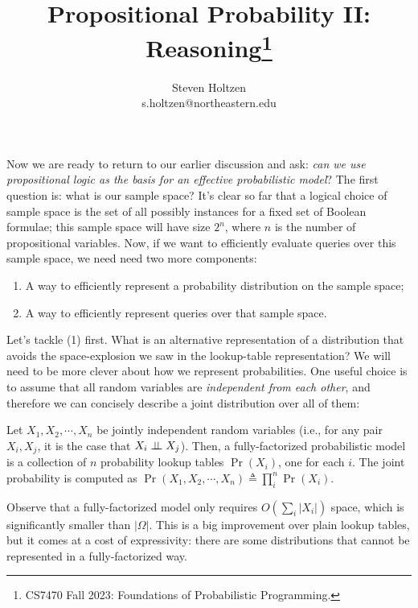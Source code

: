 \documentclass{tufte-handout}
\title{Propositional Probability II: Reasoning\thanks{CS7470 Fall 2023: Foundations of Probabilistic Programming.}}
\author[]{Steven Holtzen\\s.holtzen@northeastern.edu}
\begin{document}
\maketitle%


Now we are ready to return to our earlier discussion and ask: \emph{can we use
propositional logic as the basis for an effective probabilistic model}?
The first question is: what is our sample space? It's clear so far that a logical 
choice of sample space is the set of all possibly instances for a fixed set 
of Boolean formulae; this sample space will have size $2^n$, where $n$ is the number 
of propositional variables.
Now, if we want to efficiently evaluate queries over this sample space, we need
need two more components:
\begin{enumerate}
    \item A way to efficiently represent a probability distribution on the sample space;
    \item A way to efficiently represent queries over that sample space.
\end{enumerate}

Let's tackle (1) first. What is an alternative representation of a distribution 
that avoids the space-explosion we saw in the lookup-table representation? We 
will need to be more clever about how we represent probabilities. One useful
choice is to assume that all random variables are \emph{independent from each other}, 
and therefore we can concisely describe a joint distribution over all of them:

\begin{definition}
    Let $X_1, X_2, \cdots, X_n$ be jointly independent random variables (i.e.,
    for any pair $X_i, X_j$, it is the case that $X_i \perp \!\!\! \perp X_j$). Then, a
    fully-factorized probabilistic model is a collection of $n$ probability
    lookup tables $\Pr(X_i)$, one for each $i$. The joint probability is computed 
    as $\Pr(X_1, X_2, \cdots, X_n) \triangleq \prod_i^n \Pr(X_i)$.
\end{definition}

Observe that a fully-factorized model only requires $O(\sum_i |X_i|)$ space,
which is significantly smaller than $|\Omega|$. This is a big improvement
over plain lookup tables, but it comes at a cost of expressivity: there are some
distributions that cannot be represented in a fully-factorized way.
\end{document}
